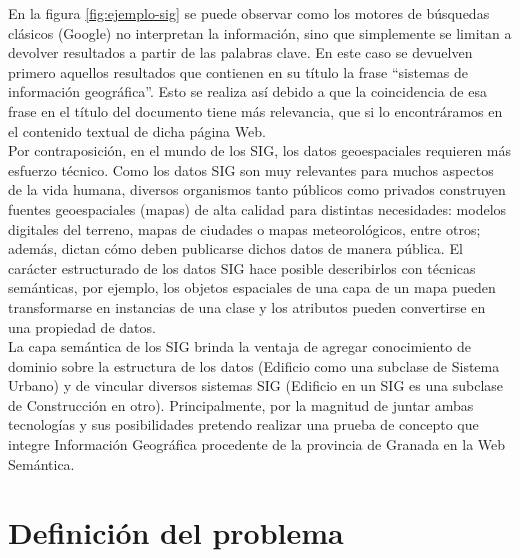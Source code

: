 En la figura \ref{fig:ejemplo-sig} se puede observar como los motores de búsquedas clásicos (Google) no interpretan la información, sino que simplemente se limitan a devolver resultados a partir de las palabras clave. En este caso se devuelven primero aquellos resultados que contienen en su título la frase ``sistemas de información geográfica''. Esto se realiza así debido a que la coincidencia de esa frase en el título del documento tiene más relevancia, que si lo encontráramos en el contenido textual de dicha página Web.\\

Por contraposición, en el mundo de los SIG, los datos geoespaciales requieren más esfuerzo técnico. Como los datos SIG son muy relevantes para muchos aspectos de la vida humana, diversos organismos tanto públicos como privados construyen fuentes geoespaciales (mapas) de alta calidad para distintas necesidades: modelos digitales del terreno, mapas de ciudades o mapas meteorológicos, entre otros; además, dictan cómo deben publicarse dichos datos de manera pública. El carácter estructurado de los datos SIG hace posible describirlos con técnicas semánticas, por ejemplo, los objetos espaciales de una capa de un mapa pueden transformarse en instancias de una clase y los atributos pueden convertirse en una propiedad de datos.\\

La capa semántica de los SIG brinda la ventaja de agregar conocimiento de dominio sobre la estructura de los datos (Edificio como una subclase de Sistema Urbano) y de vincular diversos sistemas SIG (Edificio en un SIG es una subclase de Construcción en otro). Principalmente, por la magnitud de juntar ambas tecnologías y sus posibilidades pretendo realizar una prueba de concepto que integre Información Geográfica procedente de la provincia de Granada en la Web Semántica.


\section{Definición del problema}


